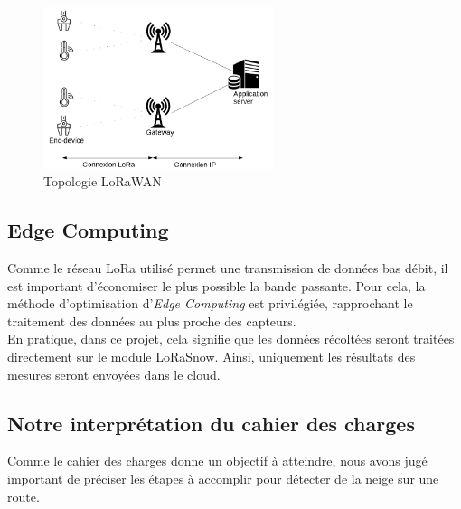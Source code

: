 \begin{figure}[H]
    \centering
    \includegraphics[width=0.6\textwidth]{Images/Illustration/Architecture_lorawan.png}
    \caption[]{Topologie LoRaWAN\footnotemark[1]}
    \label{fig:LoRaWANTopo}
\end{figure}


\subsection{Edge Computing}

Comme le réseau LoRa utilisé permet une transmission de données bas débit, il est important d'économiser
le plus possible la bande passante. Pour cela, la méthode d'optimisation d'\emph{Edge Computing} est
privilégiée, rapprochant le traitement des données au plus proche des capteurs.\\
En pratique, dans ce projet, cela signifie que les données récoltées seront traitées directement sur 
le module LoRaSnow. Ainsi, uniquement les résultats des mesures seront envoyées dans le cloud.
\newpage

\subsection{Notre interprétation du cahier des charges}
Comme le cahier des charges donne un objectif à atteindre, nous avons jugé important de préciser les 
étapes à accomplir pour détecter de la neige sur une route.

